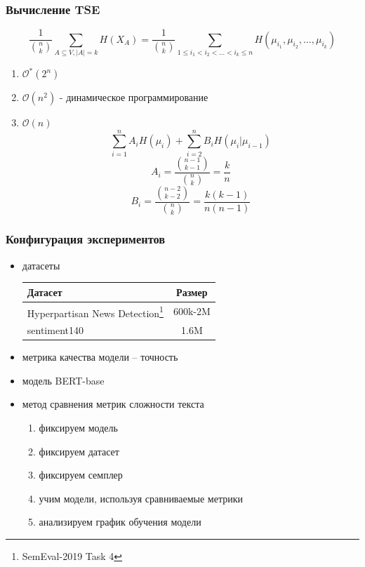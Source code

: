 \documentclass{beamer}
\begin{document}
\begin{frame}
	\frametitle{Вычисление TSE}
		\[
			\frac{1}{\binom{n}{k}}\sum\limits_{A\subseteq V,|A|=k}H(X_A) =
			\frac{1}{\binom{n}{k}}\sum\limits_{1 \le i_1 < i_2 < \ldots < i_k \le n}H(\mu_{i_1}, \mu_{i_2}, \ldots, \mu_{i_k})
		\]
		\begin{enumerate}
			\item $\mathcal{O^*}(2^n)$
			\item $\mathcal{O}(n^2)$ - динамическое программирование
			\item $\mathcal{O}(n)$
				\[
					\sum\limits_{i=1}^{n}A_iH(\mu_i) + \sum\limits_{i=2}^{n}B_iH(\mu_i|\mu_{i-1})
				\]
				\[
					A_i = \frac{\binom{n-1}{k-1}}{\binom{n}{k}} = \frac{k}{n}
				\]
				\[
					B_i = \frac{\binom{n-2}{k-2}}{\binom{n}{k}} = \frac{k(k-1)}{n(n-1)}
				\]
		\end{enumerate}
\end{frame}

\begin{frame}
	\frametitle{Конфигурация экспериментов}
	\begin{itemize}
		\item датасеты
		\begin{table}
			\begin{tabular}{l|c}
				Датасет & Размер \\
				\hline\hline
				Hyperpartisan News Detection\footnote[1]{SemEval-2019 Task 4} & 600k-2M \\
				sentiment140 & 1.6M \\
			\end{tabular}
		\end{table}
		\item метрика качества модели -- точность
		\item модель BERT-base
		\item метод сравнения метрик сложности текста
			\begin{enumerate}
				\item фиксируем модель
				\item фиксируем датасет
				\item фиксируем семплер
				\item учим модели, используя сравниваемые метрики
				\item анализируем график обучения модели
			\end{enumerate}
	\end{itemize}
\end{frame}
\end{document}
